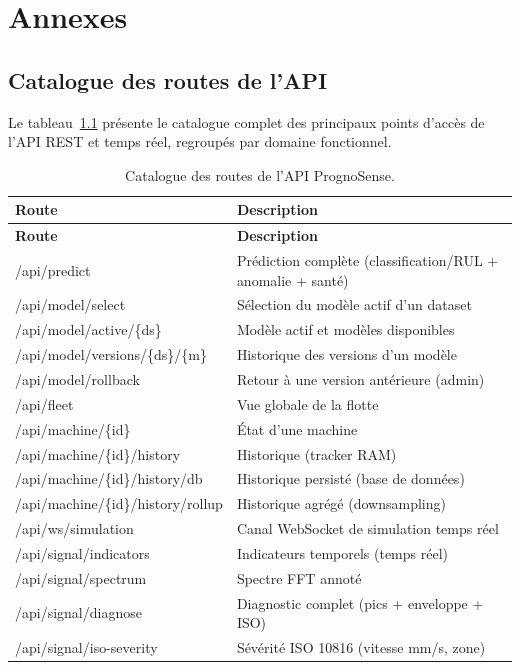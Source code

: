 \chapter{Annexes}
\label{chap:annexes}

\section{Catalogue des routes de l'API}
Le tableau~\ref{tab:api} présente le catalogue complet des principaux points d'accès de
l'API REST et temps réel, regroupés par domaine fonctionnel.

\begin{longtable}{>{\ttfamily\footnotesize}l >{\footnotesize}p{8.5cm}}
\caption{Catalogue des routes de l'API PrognoSense.}\label{tab:api}\\
\toprule
\textnormal{\bfseries Route} & \textnormal{\bfseries Description} \\
\midrule
\endfirsthead
\toprule
\textnormal{\bfseries Route} & \textnormal{\bfseries Description} \\
\midrule
\endhead
\bottomrule
\endfoot
/api/predict & Prédiction complète (classification/RUL + anomalie + santé) \\
/api/model/select & Sélection du modèle actif d'un dataset \\
/api/model/active/\{ds\} & Modèle actif et modèles disponibles \\
/api/model/versions/\{ds\}/\{m\} & Historique des versions d'un modèle \\
/api/model/rollback & Retour à une version antérieure (admin) \\
/api/fleet & Vue globale de la flotte \\
/api/machine/\{id\} & État d'une machine \\
/api/machine/\{id\}/history & Historique (tracker RAM) \\
/api/machine/\{id\}/history/db & Historique persisté (base de données) \\
/api/machine/\{id\}/history/rollup & Historique agrégé (downsampling) \\
/api/ws/simulation & Canal WebSocket de simulation temps réel \\
/api/signal/indicators & Indicateurs temporels (temps réel) \\
/api/signal/spectrum & Spectre FFT annoté \\
/api/signal/diagnose & Diagnostic complet (pics + enveloppe + ISO) \\
/api/signal/iso-severity & Sévérité ISO 10816 (vitesse mm/s, zone) \\

\end{longtable}
